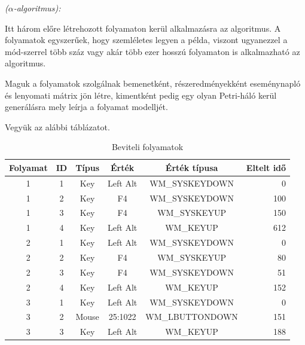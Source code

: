 \begin{definition}{\textit{($\alpha$-algoritmus):}}
\begin{enumerate}
\end{enumerate}

\cite{article:001}
\end{definition}

\begin{example}
	Itt három előre létrehozott folyamaton kerül alkalmazásra az algoritmus. A folyamatok egyszerűek, hogy szemléletes legyen a példa, viszont ugyanezzel a mód\hyp{}szerrel több száz vagy akár több ezer hosszú folyamaton is alkalmazható az algoritmus.
	
	Maguk a folyamatok szolgálnak bemenetként, részeredményekként eseménynapló és lenyomati mátrix jön létre, kimentként pedig egy olyan Petri-háló kerül generálásra mely leírja a folyamat modelljét.

	Vegyük az alábbi táblázatot.
	\newpage

	\begin{table}[h!]
	\begin{center}
	\caption{Beviteli folyamatok}
	\begin{tabular}{|| c | c | c | c | c | r ||}
		\hline\hline
		\textbf{Folyamat} & \textbf{ID} & \textbf{Típus} & \textbf{Érték} & \textbf{Érték típusa} &  \textbf{Eltelt idő} \\ [0.5ex]
		\hline\hline
		1 & 1 & Key&  Left Alt & WM\_SYSKEYDOWN & 0 \\
		\hline
		1 & 2 & Key&  F4 & WM\_SYSKEYDOWN & 100 \\
		\hline
		1 & 3 & Key&  F4 & WM\_SYSKEYUP & 150 \\
		\hline
		1 & 4 & Key&  Left Alt & WM\_KEYUP & 612 \\
		\hline\hline
		2 & 1 & Key & Left Alt & WM\_SYSKEYDOWN & 0 \\
		\hline
		2 & 2 & Key & F4 & WM\_SYSKEYUP & 80 \\
		\hline
		2 & 3 & Key & F4 & WM\_SYSKEYDOWN & 51 \\
		\hline
		2 & 4 & Key & Left Alt & WM\_KEYUP & 152 \\
		\hline\hline
		3 & 1 & Key & Left Alt & WM\_SYSKEYDOWN & 0 \\
		\hline
		3 & 2 & Mouse & 25:1022 & WM\_LBUTTONDOWN & 151 \\
		\hline
		3 & 3 & Key & Left Alt & WM\_KEYUP & 188 \\
		\hline\hline
	\end{tabular}
	\label{fig:planexample}
	\end{center}
	\end{table}	


\end{example}
